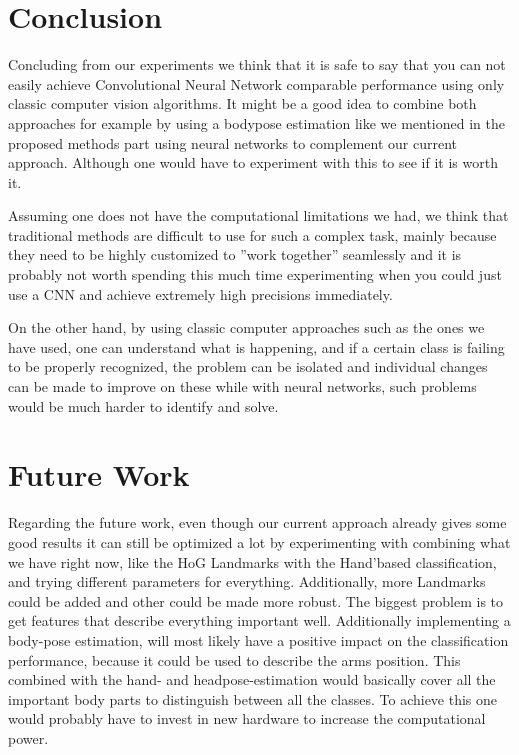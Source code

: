 \documentclass[10pt,twocolumn,letterpaper]{article}
\begin{document}
\section{Conclusion}
Concluding from our experiments we think that it is safe to say that you can not easily achieve Convolutional Neural Network comparable performance using only classic computer vision algorithms. It might be a good idea to combine both approaches for example by using a bodypose estimation like we mentioned in the proposed methods part using neural networks to complement our current approach. Although one would have to experiment with this to see if it is worth it.

Assuming one does not have the computational limitations we had, we think that traditional methods are difficult to use for such a complex task, mainly because they need to be highly customized to ''work together'' seamlessly and it is probably not worth spending this much time experimenting when you could just use a CNN and achieve extremely high precisions immediately. 

On the other hand, by using classic computer approaches such as the ones we have used, one can understand what is happening, and if a certain class is failing to be properly recognized, the problem can be isolated and individual changes can be made to improve on these while with neural networks, such problems would be much harder to identify and solve.


\section{Future Work}
Regarding the future work, even though our current approach already gives some good results it can still be optimized a lot by experimenting with combining what we have right now, like the HoG Landmarks with the Hand'based classification, and trying different parameters for everything. Additionally, more Landmarks could be added and other could be made more robust. The biggest problem is to get features that describe everything important well. Additionally implementing a body-pose estimation, will most likely have a positive impact on the classification performance, because it could be used to describe the arms position. This combined with the hand- and headpose-estimation would basically cover all the important body parts to distinguish between all the classes. To achieve this one would probably have to invest in new hardware to increase the computational power.





{\small


}
\end{document}
